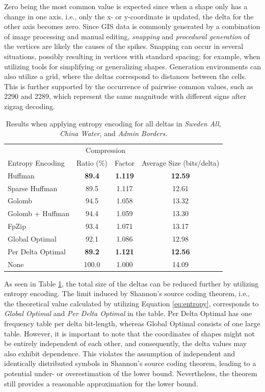 Zero being the most common value is expected since when a shape only has a change in one axis, i.e., only the x- or y-coordinate is updated, the delta for the other axis becomes zero. Since GIS data is commonly generated by a combination of image processing and manual editing, \emph{snapping} and \emph{procedural generation} of the vertices are likely the causes of the spikes. Snapping can occur in several situations, possibly resulting in vertices with standard spacing; for example, when utilizing tools for simplifying or generalizing shapes. Generation environments can also utilize a grid, where the deltas correspond to distances between the cells. This is further supported by the occurrence of pairwise common values, such as 2290 and 2289, which represent the same magnitude with different signs after zigzag decoding.
\begin{table}[H]
\centering
\caption{Results when applying entropy encoding for all deltas in \emph{Sweden All}, \emph{China Water}, and \emph{Admin Borders}.} 
\begin{tabular}{l|ccc}
\toprule   
 {} & \multicolumn{2}{c}{Compression}\\

Entropy Encoding & Ratio (\%) & Factor & Average Size (bits/delta) \\ 
\midrule
Huffman & \textbf{89.4} & \textbf{1.119} & \textbf{12.59}  \\ 
Sparse Huffman & 89.5 & 1.117 & 12.61  \\
Golomb & 94.5 & 1.058 & 13.32   \\
Golomb + Huffman & 94.4 & 1.059 & 13.30   \\
FpZip & 93.4 & 1.071 & 13.17   \\
\midrule
Global Optimal & 92.1 & 1.086 & 12.98  \\
Per Delta Optimal & \textbf{89.2} & \textbf{1.121} & \textbf{12.56}  \\
None & 100.0 & 1.000 & 14.09  \\ 
\bottomrule
\end{tabular}
\label{tab:entropyDeltas}
\end{table}


As seen in Table \ref{tab:entropyDeltas}, the total size of the deltas can be reduced further by utilizing entropy encoding. The limit induced by Shannon's source coding theorem, i.e., the theoretical value calculated by utilizing Equation \ref{eq:entropy}, corresponds to \emph{Global Optimal} and \emph{Per Delta Optimal} in the table. Per Delta Optimal has one frequency table per delta bit-length, whereas Global Optimal consists of one large table. However, it is important to note that the coordinates of shapes might not be entirely independent of each other, and consequently, the delta values may also exhibit dependence. This violates the assumption of independent and identically distributed symbols in Shannon's source coding theorem, leading to a potential under- or overestimation of the lower bound. Nevertheless, the theorem still provides a reasonable approximation for the lower bound.


